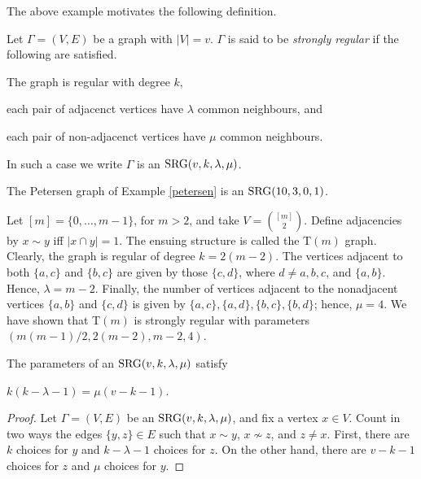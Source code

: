 \documentclass[../../../main]{subfiles}
\begin{document}
The above example motivates the following definition.

\begin{defin}\label{srg definition}
 Let $\Gamma = (V,E)$ be a graph with $|V| = v$. $\Gamma$ is said to be {\it strongly regular} if the following are satisfied.
 \begin{defenum}
  \item The graph is regular with degree $k$,
  
  \item each pair of adjacenct vertices have $\lambda$ common neighbours, and
  
  \item each pair of non-adjacenct vertices have $\mu$ common neighbours.
 \end{defenum}
 In such a case we write $\Gamma$ is an $\text{SRG}(v,k,\lambda,\mu)$.
\end{defin}

\begin{ex}
 The Petersen graph of Example \ref{petersen} is an $\text{SRG}(10,3,0,1)$.
\end{ex}

\begin{ex}
 Let $[m]=\{0,\dots,m-1\}$, for $m>2$, and take $V=\binom{[m]}{2}$. Define adjacencies by $x \sim y$ iff $|x \cap y|=1$. The ensuing structure is called the T$(m)$ graph. Clearly, the graph is regular of degree $k=2(m-2)$. The vertices adjacent to both $\{a,c\}$ and $\{b,c\}$ are given by those $\{c,d\}$, where $d \neq a,b,c$, and $\{a,b\}$. Hence, $\lambda=m-2$. Finally, the number of vertices adjacent to the nonadjacent vertices $\{a,b\}$ and $\{c,d\}$ is given by $\{a,c\},\{a,d\},\{b,c\},\{b,d\}$; hence, $\mu=4$. We have shown that T$(m)$ is strongly regular with parameters $(m(m-1)/2,2(m-2),m-2,4)$.
\end{ex}

\begin{prop}\label{srg parameters}
 The parameters of an $\text{SRG}(v,k,\lambda,\mu)$ satisfy 
 \begin{defenum}
 \item\label{srg-params} $k(k-\lambda-1) = \mu(v-k-1)$.
 \end{defenum}
\end{prop}

\begin{proof}
 Let $\Gamma = (V,E)$ be an $\text{SRG}(v,k,\lambda,\mu)$, and fix a vertex $x \in V$. Count in two ways the edges $\{y,z\} \in E$ such that $x \sim y$, $x \not\sim z$, and $z \neq x$. First, there are $k$ choices for $y$ and $k-\lambda-1$ choices for $z$. On the other hand, there are $v-k-1$ choices for $z$ and $\mu$ choices for $y$.
\end{proof}
\end{document}
